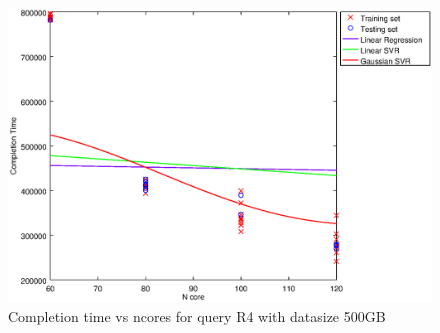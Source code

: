 
\begin {figure}[hbtp]
\centering
\includegraphics[width=\textwidth]{output/R4_500_LINEAR_NCORE/plot_R4_500_bestmodels.eps}
\caption{Completion time vs ncores for query R4 with datasize 500GB}
\label{fig:coreonly_linear_R4_500}
\end {figure}
